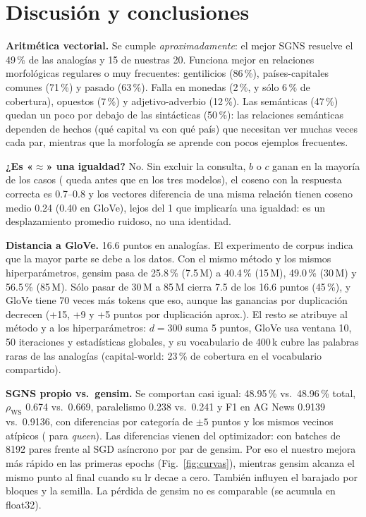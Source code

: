 \documentclass[10pt,letterpaper]{article}
\begin{document}
\section{Discusión y conclusiones}
\textbf{Aritmética vectorial.} Se cumple \emph{aproximadamente}: el mejor SGNS resuelve el 49\,\% de las analogías y 15 de
nuestras 20. Funciona mejor en relaciones morfológicas regulares o muy frecuentes: gentilicios (86\,\%), países-capitales
comunes (71\,\%) y pasado (63\,\%). Falla en monedas (2\,\%, y sólo 6\,\% de cobertura), opuestos (7\,\%) y
adjetivo-adverbio (12\,\%). Las semánticas (47\,\%) quedan un poco por debajo de las sintácticas (50\,\%): las relaciones
semánticas dependen de hechos (qué capital va con qué país) que necesitan ver muchas veces cada par, mientras que la
morfología se aprende con pocos ejemplos frecuentes.

\textbf{¿Es «$\approx$» una igualdad?} No. Sin excluir la consulta, $b$ o $c$ ganan en la mayoría de los casos
( queda antes que  en los tres modelos), el coseno con la respuesta correcta es 0.7--0.8 y los
vectores diferencia de una misma relación tienen coseno medio 0.24 (0.40 en GloVe), lejos del 1 que implicaría una
igualdad: es un desplazamiento promedio ruidoso, no una identidad.

\textbf{Distancia a GloVe.} 16.6 puntos en analogías. El experimento de corpus indica que la mayor parte se debe a los
datos. Con el mismo método y los mismos hiperparámetros, gensim pasa de 25.8\,\% (7.5\,M) a 40.4\,\% (15\,M), 49.0\,\% (30\,M)
y 56.5\,\% (85\,M). Sólo pasar de 30\,M a 85\,M cierra 7.5 de los 16.6 puntos (45\,\%), y GloVe tiene 70 veces más tokens que
eso, aunque las ganancias por duplicación decrecen (+15, +9 y +5 puntos por duplicación aprox.). El resto se atribuye al
método y a los hiperparámetros: $d=300$ suma 5 puntos, GloVe usa ventana 10, 50 iteraciones y estadísticas globales, y su
vocabulario de 400\,k cubre las palabras raras de las analogías (capital-world: 23\,\% de cobertura en el vocabulario
compartido).

\textbf{SGNS propio vs.\ gensim.} Se comportan casi igual: 48.95\,\% vs.\ 48.96\,\% total, $\rho_\text{WS}$ 0.674 vs.\ 0.669,
paralelismo 0.238 vs.\ 0.241 y F1 en AG News 0.9139 vs.\ 0.9136, con diferencias por categoría de $\pm5$ puntos y los mismos
vecinos atípicos ( para \emph{queen}). Las diferencias vienen del optimizador:  con batches de
\num{8192} pares frente al SGD asíncrono por par de gensim. Por eso el nuestro mejora más rápido en las primeras epochs
(Fig.~\ref{fig:curvas}), mientras gensim alcanza el mismo punto al final cuando su lr decae a cero. También influyen el
barajado por bloques y la semilla. La pérdida de gensim no es comparable (se acumula en float32).
\end{document}
